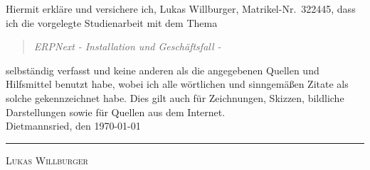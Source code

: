 Hiermit erkläre und versichere ich, Lukas Willburger, Matrikel-Nr.\ 322445, dass ich die vorgelegte Studienarbeit mit dem Thema
\begin{quote}
\textit{ERPNext} \textit{- Installation und Geschäftsfall -}
\end{quote}
selbständig verfasst und keine anderen als die angegebenen Quellen und Hilfsmittel benutzt habe, wobei ich alle wörtlichen und sinngemäßen Zitate als solche gekennzeichnet habe.  Dies gilt auch für Zeichnungen, Skizzen, bildliche Darstellungen sowie für Quellen aus dem Internet.
\\[6ex]

Dietmannsried, den \today


\rule[-0.2cm]{5cm}{0.5pt}

\textsc{Lukas Willburger} 
